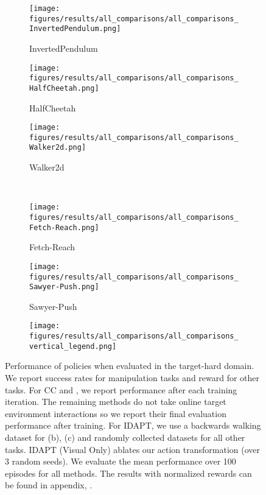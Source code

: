 \begin{figure*}[t]
    \centering
    \begin{subfigure}[t]{0.29\linewidth}
        \centering
        \texttt{[image: figures/results/all\_comparisons/all\_comparisons\_InvertedPendulum.png]}
        \caption{InvertedPendulum}
        \label{fig:result_step:invertedpendulum}
    \end{subfigure}
    \begin{subfigure}[t]{0.29\linewidth}
        \centering
        \texttt{[image: figures/results/all\_comparisons/all\_comparisons\_HalfCheetah.png]}
        \caption{HalfCheetah}
        \label{fig:result_step:halfcheetah}
    \end{subfigure}
    \begin{subfigure}[t]{0.29\linewidth}
        \centering
        \texttt{[image: figures/results/all\_comparisons/all\_comparisons\_Walker2d.png]}
        \caption{Walker2d}
        \label{fig:result_step:walker2d}
    \end{subfigure}
    \\
    \begin{subfigure}[t]{0.29\linewidth}
        \centering
        \texttt{[image: figures/results/all\_comparisons/all\_comparisons\_Fetch-Reach.png]}
        \caption{Fetch-Reach}
        \label{fig:result_step:fetchreach}
    \end{subfigure}
    \begin{subfigure}[t]{0.29\linewidth}
        \centering
        \texttt{[image: figures/results/all\_comparisons/all\_comparisons\_Sawyer-Push.png]}
        \caption{Sawyer-Push}
        \label{fig:result_step:sawyer_push}
    \end{subfigure}
    \begin{subfigure}[t]{0.29\linewidth}
        \centering
        \texttt{[image: figures/results/all\_comparisons/all\_comparisons\_vertical\_legend.png]}
    \end{subfigure}
    \caption{
    Performance of policies when evaluated in the target-hard domain.  We report success rates for manipulation tasks and reward for other tasks. For CC and \method, we report performance after each training iteration.  The remaining methods do not take online target environment interactions so we report their final evaluation performance after training.  For IDAPT, we use a backwards walking dataset for (b), (c) and randomly collected datasets for all other tasks. IDAPT (Visual Only) ablates our action transformation (over 3 random seeds). We evaluate the mean performance over 100 episodes for all methods. The results with normalized rewards can be found in appendix, .
    }
    \label{fig:result_step}
\end{figure*}



